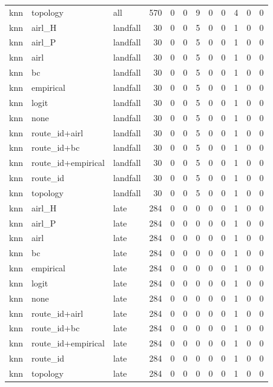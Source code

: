 \begin{tabular}{lllrrrrrrrrr}
knn & topology & all & 570 & 0 & 0 & 9 & 0 & 0 & 4 & 0 & 0 \\
knn & airl_H & landfall & 30 & 0 & 0 & 5 & 0 & 0 & 1 & 0 & 0 \\
knn & airl_P & landfall & 30 & 0 & 0 & 5 & 0 & 0 & 1 & 0 & 0 \\
knn & airl & landfall & 30 & 0 & 0 & 5 & 0 & 0 & 1 & 0 & 0 \\
knn & bc & landfall & 30 & 0 & 0 & 5 & 0 & 0 & 1 & 0 & 0 \\
knn & empirical & landfall & 30 & 0 & 0 & 5 & 0 & 0 & 1 & 0 & 0 \\
knn & logit & landfall & 30 & 0 & 0 & 5 & 0 & 0 & 1 & 0 & 0 \\
knn & none & landfall & 30 & 0 & 0 & 5 & 0 & 0 & 1 & 0 & 0 \\
knn & route_id+airl & landfall & 30 & 0 & 0 & 5 & 0 & 0 & 1 & 0 & 0 \\
knn & route_id+bc & landfall & 30 & 0 & 0 & 5 & 0 & 0 & 1 & 0 & 0 \\
knn & route_id+empirical & landfall & 30 & 0 & 0 & 5 & 0 & 0 & 1 & 0 & 0 \\
knn & route_id & landfall & 30 & 0 & 0 & 5 & 0 & 0 & 1 & 0 & 0 \\
knn & topology & landfall & 30 & 0 & 0 & 5 & 0 & 0 & 1 & 0 & 0 \\
knn & airl_H & late & 284 & 0 & 0 & 0 & 0 & 0 & 1 & 0 & 0 \\
knn & airl_P & late & 284 & 0 & 0 & 0 & 0 & 0 & 1 & 0 & 0 \\
knn & airl & late & 284 & 0 & 0 & 0 & 0 & 0 & 1 & 0 & 0 \\
knn & bc & late & 284 & 0 & 0 & 0 & 0 & 0 & 1 & 0 & 0 \\
knn & empirical & late & 284 & 0 & 0 & 0 & 0 & 0 & 1 & 0 & 0 \\
knn & logit & late & 284 & 0 & 0 & 0 & 0 & 0 & 1 & 0 & 0 \\
knn & none & late & 284 & 0 & 0 & 0 & 0 & 0 & 1 & 0 & 0 \\
knn & route_id+airl & late & 284 & 0 & 0 & 0 & 0 & 0 & 1 & 0 & 0 \\
knn & route_id+bc & late & 284 & 0 & 0 & 0 & 0 & 0 & 1 & 0 & 0 \\
knn & route_id+empirical & late & 284 & 0 & 0 & 0 & 0 & 0 & 1 & 0 & 0 \\
knn & route_id & late & 284 & 0 & 0 & 0 & 0 & 0 & 1 & 0 & 0 \\
knn & topology & late & 284 & 0 & 0 & 0 & 0 & 0 & 1 & 0 & 0 \\

\end{tabular}
